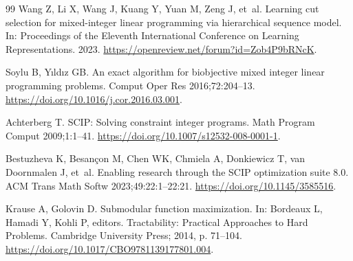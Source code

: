 \documentclass[final,5p,times,twocolumn]{elsarticle}
\begin{document}
\begin{thebibliography}{99}
Wang Z, Li X, Wang J, Kuang Y, Yuan M, Zeng J, et~al. Learning cut selection for mixed-integer linear programming via hierarchical sequence model.
In: Proceedings of the Eleventh International Conference on Learning Representations. 2023.
\url{https://openreview.net/forum?id=Zob4P9bRNcK}.

Soylu B, Yıldız GB. An exact algorithm for biobjective mixed integer linear programming problems.
Comput Oper Res 2016;72:204--13.
\url{https://doi.org/10.1016/j.cor.2016.03.001}.

Achterberg T. {SCIP}: Solving constraint integer programs.
Math Program Comput 2009;1:1--41.
\url{https://doi.org/10.1007/s12532-008-0001-1}.

Bestuzheva K, Besan{\c{c}}on M, Chen WK, Chmiela A, Donkiewicz T, van Doornmalen J, et~al. Enabling research through the {SCIP} optimization suite 8.0.
ACM Trans Math Softw 2023;49:22:1--22:21.
\url{https://doi.org/10.1145/3585516}.

Krause A, Golovin D. Submodular function maximization.
In: Bordeaux L, Hamadi Y, Kohli P, editors. Tractability: Practical Approaches to Hard Problems. Cambridge University Press; 2014, p. 71--104.
\url{https://doi.org/10.1017/CBO9781139177801.004}.

\end{thebibliography}
\end{document}
